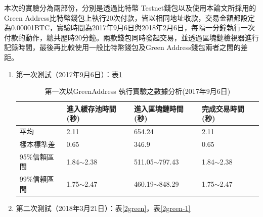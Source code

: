 		本次的實驗分為兩部份，分別是透過比特幣 Testnet錢包以及使用本論文所採用的Green Address比特幣錢包上執行20次付款，皆以相同地址收款，交易金額都設定為0.00001BTC，實驗時間為2017年9月6日與2018年2月6日，每隔一分鐘執行一次付款的動作，總共歷時20分鐘。兩款錢包同時發起交易，並透過區塊鏈檢視器進行記錄時間，最後再比較使用一般比特幣錢包及Green Address錢包兩者之間的差距。

		\begin{enumerate}
			\item 第一次測試（2017年9月6日）：表\ref{1green}

			\begin{table}[htbp]
				\centering
				\caption{第一次以GreenAddress 執行實驗之數據分析(2017年9月6日)}
				\label{1green}
				\begin{tabular}{|l|l|l|l|}
				\hline
				 & 進入緩存池時間(秒) & 進入區塊鏈時間(秒) & 完成交易時間(秒) \\ \hline
				平均 & 2.11 & 654.24 & 2.11 \\ \hline
				樣本標準差 & 0.65 & 346.9 & 0.65 \\ \hline
				95\%信賴區間 & 1.84$\sim$2.38 & 511.05$\sim$797.43 & 1.84$\sim$2.38 \\ \hline
				99\%信賴區間 & 1.75$\sim$2.47 & 460.19$\sim$848.29 & 1.75$\sim$2.47 \\ \hline
				\end{tabular}
				\end{table}

			\item 第二次測試（2018年3月21日）：表\ref{2green}，表\ref{2green-1}

		\end{enumerate}
